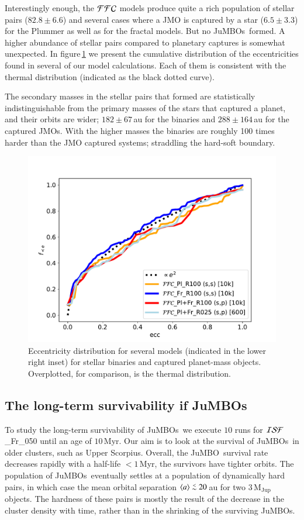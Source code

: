 \documentclass[submission,phys]{lib/SciPost}
\def\aplt{\ {\raise-.5ex\hbox{$\buildrel<\over\sim$}}\ }
\newcommand{\jumbo}{\mbox{JuMBO}}
\newcommand{\jumbos}{\mbox{JuMBOs}}
\begin{document}
Interestingly enough, the ${\cal FFC}$ models produce quite a rich
population of stellar pairs ($82.8\pm 6.6$) and several cases where a
JMO is captured by a star ($6.5\pm3.3$) for the Plummer as well as for
the fractal models. But no \jumbos\, formed. A higher abundance of
stellar pairs compared to planetary captures is somewhat unexpected.
In figure\,\ref{Fig:eccentricity_FFC_Fr025} we present the cumulative
distribution of the eccentricities found in several of our model
calculations. Each of them is consistent with the thermal distribution
(indicated as the black dotted curve).

The secondary masses in the stellar pairs that formed are
statistically indistinguishable from the primary masses of the stars
that captured a planet, and their orbits are wider; $182\pm67$\,au for
the binaries and $288\pm164$\,au for the captured JMOs.  With the
higher masses the binaries are roughly 100 times harder than the JMO
captured systems; straddling the hard-soft boundary.

\begin{figure}
    \centering
        \includegraphics[width=0.75\columnwidth]{figures/fig_eccentricity_FFC.pdf}
        \caption{Eccentricity distribution for several models
          (indicated in the lower right inset) for stellar binaries and
          captured planet-mass objects. Overplotted, for comparison,
          is the thermal distribution.}
         \label{Fig:eccentricity_FFC_Fr025}
\end{figure}

\subsection{The long-term survivability if \jumbos}

To study the long-term survivability of \jumbos\, we execute $10$ runs
for ${\cal ISF}$\_Fr\_050 until an age of $10$\,Myr.  Our aim is to look 
at the survival of \jumbos\, in older clusters, such as Upper Scorpius. Overall,
the \jumbo\, survival rate decreases rapidly with a half-life
$<1$\,Myr, the survivors have tighter orbits.  The population of
\jumbos\, eventually settles at a population of dynamically hard
pairs, in which case the mean orbital separation $\langle a\rangle
\aplt 20$\,au for two $3\, \mathrm{M_{\mathrm{Jup}}}$ objects. The hardness of
these pairs is mostly the result of the decrease in the cluster
density with time, rather than in the shrinking of the surviving
\jumbos.
\end{document}
